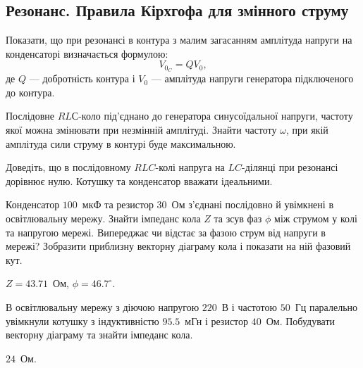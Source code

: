 \subsection*{Резонанс. Правила Кірхгофа для змінного струму}

\begin{problem}%
    Показати, що при резонансі в контура з малим загасанням амплітуда
    напруги на конденсаторі визначається формулою:
    \begin{equation*}
        V_{0_C} = QV_0,
    \end{equation*}
     де $Q$ --- добротність контура і $V_0$ --- амплітуда напруги генератора підключеного до контура.
\end{problem}

\begin{problem}%
    Послідовне $RLС$-коло під'єднано до генератора синусоїдальної напруги, частоту якої можна змінювати при незмінній амплітуді. Знайти частоту $\omega$, при якій амплітуда сили струму в контурі буде максимальною.
\end{problem}

\begin{problem}%
    Доведіть, що в послідовному $RLC$-колі напруга на $LC$-ділянці при резонансі дорівнює нулю. Котушку та конденсатор вважати ідеальними.
\end{problem}

\begin{problem}%
    Конденсатор $100$~мкФ та резистор $30$~Ом з'єднані послідовно й увімкнені в освітлювальну мережу. Знайти імпеданс кола $Z$ та зсув фаз $\phi$ між струмом у колі та напругою мережі. Випереджає чи відстає за фазою струм від напруги в мережі? Зобразити приблизну векторну діаграму кола і показати на ній фазовий кут.
\begin{solution}
    $Z = 43.71$~Ом, $\phi = 46.7^\circ$.
\end{solution}
\end{problem}



\begin{problem}%
    В освітлювальну мережу з діючою напругою $220$~В і частотою $50$~Гц
    паралельно увімкнули котушку з індуктивністю $95.5$~мГн і резистор $40$~Ом. Побудувати векторну діаграму та знайти імпеданс кола.
\begin{solution}
    $24$~Ом.
\end{solution}
\end{problem}


